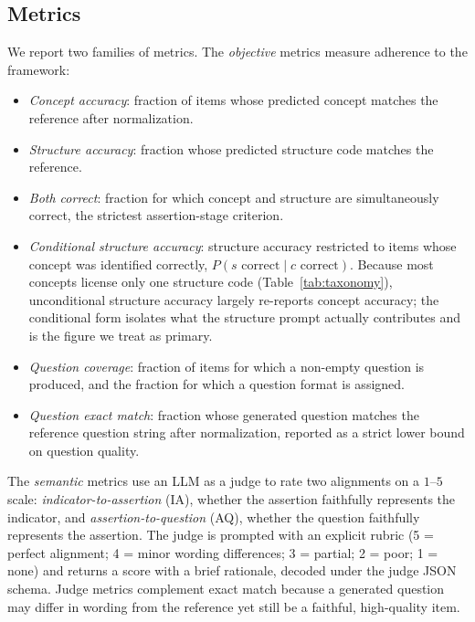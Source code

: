 \documentclass[onecolumn, 11pt]{IEEEtran}
\begin{document}
\subsection{Metrics}
We report two families of metrics. The \emph{objective} metrics measure adherence to the framework:
\begin{itemize}
\item \emph{Concept accuracy}: fraction of items whose predicted concept matches the reference after normalization.
\item \emph{Structure accuracy}: fraction whose predicted structure code matches the reference.
\item \emph{Both correct}: fraction for which concept and structure are simultaneously correct, the strictest assertion-stage criterion.
\item \emph{Conditional structure accuracy}: structure accuracy restricted to items whose concept was identified correctly, $P(s \text{ correct} \mid c \text{ correct})$. Because most concepts license only one structure code (Table~\ref{tab:taxonomy}), unconditional structure accuracy largely re-reports concept accuracy; the conditional form isolates what the structure prompt actually contributes and is the figure we treat as primary.
\item \emph{Question coverage}: fraction of items for which a non-empty question is produced, and the fraction for which a question format is assigned.
\item \emph{Question exact match}: fraction whose generated question matches the reference question string after normalization, reported as a strict lower bound on question quality.
\end{itemize}
The \emph{semantic} metrics use an LLM as a judge to rate two alignments on a $1$--$5$ scale: \emph{indicator-to-assertion} (IA), whether the assertion faithfully represents the indicator, and \emph{assertion-to-question} (AQ), whether the question faithfully represents the assertion. The judge is prompted with an explicit rubric (5 = perfect alignment; 4 = minor wording differences; 3 = partial; 2 = poor; 1 = none) and returns a score with a brief rationale, decoded under the judge JSON schema. Judge metrics complement exact match because a generated question may differ in wording from the reference yet still be a faithful, high-quality item.
\end{document}
